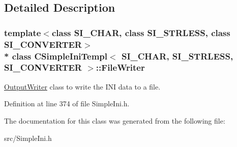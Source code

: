\subsection{Detailed Description}
\subsubsection*{template$<$class S\+I\+\_\+\+C\+H\+AR, class S\+I\+\_\+\+S\+T\+R\+L\+E\+SS, class S\+I\+\_\+\+C\+O\+N\+V\+E\+R\+T\+ER$>$\\*
class C\+Simple\+Ini\+Templ$<$ S\+I\+\_\+\+C\+H\+A\+R, S\+I\+\_\+\+S\+T\+R\+L\+E\+S\+S, S\+I\+\_\+\+C\+O\+N\+V\+E\+R\+T\+E\+R $>$\+::\+File\+Writer}

\hyperlink{class_c_simple_ini_templ_1_1_output_writer}{Output\+Writer} class to write the I\+NI data to a file. 

Definition at line 374 of file Simple\+Ini.\+h.



The documentation for this class was generated from the following file\+:\begin{DoxyCompactItemize}
\item 
src/Simple\+Ini.\+h\end{DoxyCompactItemize}

